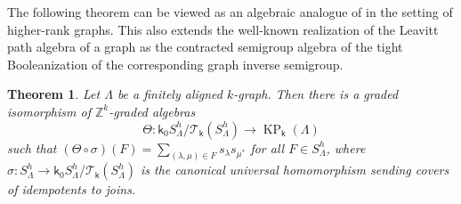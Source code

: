 \documentclass[a4paper,reqno,11pt]{amsart}
\numberwithin{equation}{section}
\newtheorem{thm}{Theorem}[section]
\theoremstyle{definition}
\theoremstyle{remark}
\newcommand{\KP}{\operatorname{KP}}
\begin{document}
The following theorem can be viewed as an algebraic analogue of \cite[Theorem 4.7]{Larki} in the setting of higher-rank graphs. This also extends the well-known realization of the Leavitt path algebra of a graph as the contracted semigroup algebra of the tight Booleanization of the corresponding graph inverse semigroup.
\begin{thm}\label{th the relationship between S_Lambda and KPA}
Let $\Lambda$ be a finitely aligned $k$-graph. Then there is a graded isomorphism of $\mathbb{Z}^k$-graded algebras \[\Theta:\mathsf{k}_0S_\Lambda^h/{\mathcal{T}_\mathsf{k}(S_\Lambda^h)}\longrightarrow \KP_\mathsf{k}(\Lambda)\] such that $(\Theta\circ \sigma)(F)=\displaystyle{\sum_{(\lambda,\mu)\in F}}s_\lambda s_{\mu^*}$ for all $F\in S_\Lambda^h$, where $\sigma:S_\Lambda^h\longrightarrow \mathsf{k}_0S_\Lambda^h/{\mathcal{T}_\mathsf{k}(S_\Lambda^h)}$ is the canonical universal homomorphism sending covers of idempotents to joins.
\end{thm}
\end{document}
